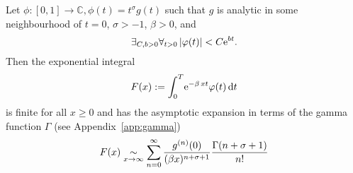 Let $\phi\colon [0,1] \to \mathbb{C}, \phi(t) = t^\sigma g(t)$ such that $g$ is
analytic in some neighbourhood of $t=0$, $\sigma > -1$, $\beta > 0$, and
\begin{equation*}
    \exists_{C, b > 0} \forall_{t > 0} \left|\phi(t)\right| < C \Eto{bt}.
\end{equation*}
Then the exponential integral
\begin{align*}
    F(x) := \Integ[T]{0}{t}{\Eto{-\beta\,xt}\phi(t)}
\end{align*}
is finite for all $x \geq 0$ and has the asymptotic expansion in terms of the
gamma function $\Gamma$ (see Appendix~\ref{app:gamma})
\begin{equation*}
    F(x)\SimAs{x\to\infty}\sum_{n=0}^{\infty}
    \frac{g^{(n)}(0)}{(\beta x)^{n+\sigma+1}} \frac{\Gamma(n+\sigma+1)}{n!}
\end{equation*}
